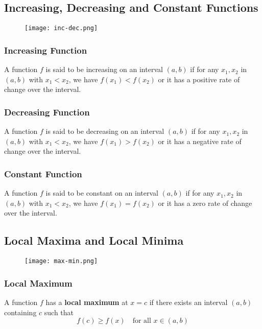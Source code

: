 \subsection{Increasing, Decreasing and Constant Functions}
\begin{figure}
  \centering
  \texttt{[image: inc-dec.png]}
\end{figure}

\subsubsection{Increasing Function}
A function \(f\) is said to be increasing on an interval \((a, b)\) if for any \(x_{1}, x_{2}\) in \((a, b)\) with \(x_{1} < x_{2}\), we have \(f(x_{1}) < f(x_{2})\) or it has a positive rate of change over the interval.

\subsubsection{Decreasing Function}
A function \(f\) is said to be decreasing on an interval \((a, b)\) if for any \(x_{1}, x_{2}\) in \((a, b)\) with \(x_{1} < x_{2}\), we have \(f(x_{1}) > f(x_{2})\) or it has a negative rate of change over the interval.

\subsubsection{Constant Function}
A function \(f\) is said to be constant on an interval \((a, b)\) if for any \(x_{1}, x_{2}\) in \((a, b)\) with \(x_{1} < x_{2}\), we have \(f(x_{1}) = f(x_{2})\) or it has a zero rate of change over the interval.

\subsection{Local Maxima and Local Minima}
\begin{figure}
  \centering
  \texttt{[image: max-min.png]}
\end{figure}

\subsubsection{Local Maximum}
A function \(f\) has a \textbf{local maximum} at \(x = c\) if there exists an interval \((a, b)\) containing \(c\) such that
\[ f(c) \geq f(x) \quad \text{for all } x \in (a, b) \]

